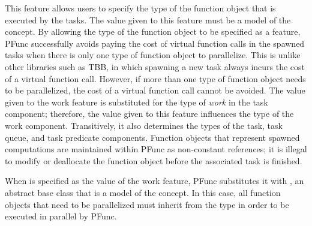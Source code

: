 This feature allows users to specify the type of the function object that is
executed by the tasks.  
%
The value given to this feature must be a model of the 
concept.
%
By allowing the type of the function object to be specified as a feature, PFunc
successfully avoids paying the cost of virtual function calls in the spawned
tasks when there is only one type of function object to parallelize.
%
This is unlike other libraries such as TBB, in which spawning a new task always
incurs the cost of a virtual function call.  
%
However, if more than one type of function object needs to be parallelized, the
cost of a virtual function call cannot be avoided.
%
The value given to the work feature is substituted for the type of \emph{work}
in the task component; therefore, the value given to this feature influences
the type of the work component.
%
Transitively, it also determines the types of the task, task queue, and task
predicate components.
%
Function objects that represent spawned computations are maintained within
PFunc as non-constant references; it is illegal to modify or deallocate the
function object before the associated task is finished.
 
When  is specified as the value of the work feature,
PFunc substitutes it with , an abstract
base class that is a model of the  concept.
%
In this case, all function objects that need to be parallelized must inherit
from the type  in order to be executed in
parallel by PFunc.
